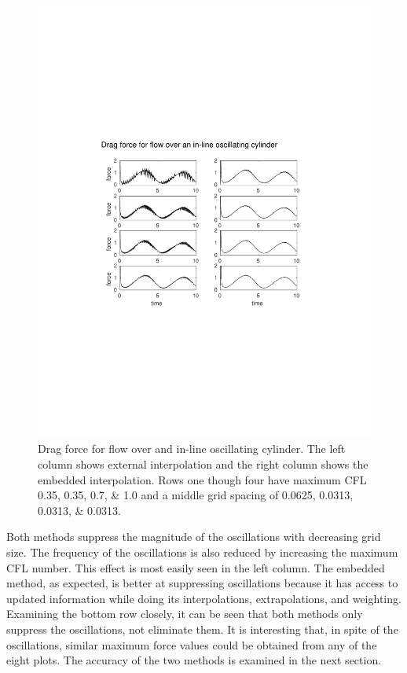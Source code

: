 \begin{figure}[!htb]
	\centering
	\includegraphics[width=\textwidth]{cropped_oscflow}
	\caption{Drag force for flow over and in-line oscillating cylinder. The left column shows external interpolation and the right column shows the embedded interpolation. Rows one though four have maximum CFL \numlist{0.35; 0.35; 0.7; 1.0} and a middle grid spacing of \numlist{0.0625; 0.0313; 0.0313; 0.0313}.}
	\label{fig:osccylinder}
\end{figure}

Both methods suppress the magnitude of the oscillations with decreasing grid size. 
The frequency of the oscillations is also reduced by increasing the maximum CFL number. 
This effect is most easily seen in the left column. 
The embedded method, as expected, is better at suppressing oscillations because it has access to updated information while doing its interpolations, extrapolations, and weighting.  
Examining the bottom row closely, it can be seen that both methods only suppress the oscillations, not eliminate them. 
It is interesting that, in spite of the oscillations, similar maximum force values could be obtained from any of the eight plots. 
The accuracy of the two methods is examined in the next section. 

